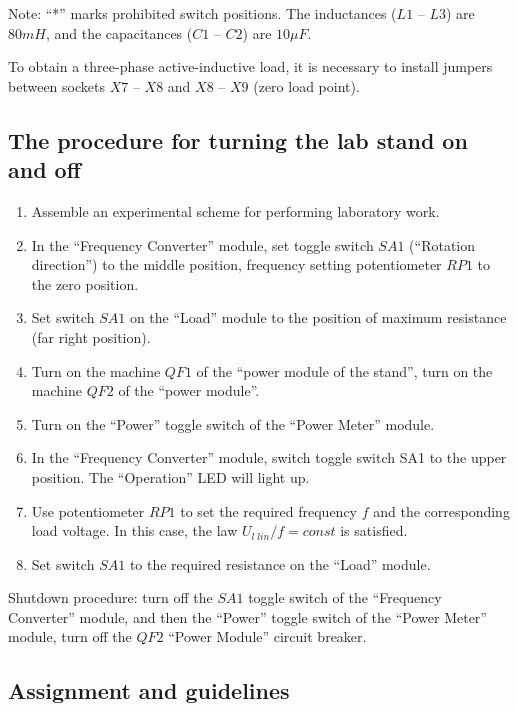 \documentclass[a4paper,14pt]{article}
\begin{document}
Note: “*” marks prohibited switch positions. The inductances ($L1$ -- $L3$) are $80 mH$, and the capacitances ($C1$ -- $C2$) are $10 \mu F$.

To obtain a three-phase active-inductive load, it is necessary to install jumpers between sockets $X7$ -- $X8$ and $X8$ -- $X9$ (zero load point).

\subsection{The procedure for turning the lab stand on and off}

\begin{enumerate}
\item Assemble an experimental scheme for performing laboratory work.
\item In the “Frequency Converter” module, set toggle switch $SA1$ (“Rotation direction”) to the middle position, frequency setting potentiometer $RP1$ to the zero position.
\item Set switch $SA1$ on the “Load” module to the position of maximum resistance (far right position).
\item Turn on the machine $QF1$ of the “power module of the stand”, turn on the machine $QF2$ of the “power module”.
\item Turn on the “Power” toggle switch of the “Power Meter” module.
\item In the “Frequency Converter” module, switch toggle switch SA1 to the upper position. The “Operation” LED will light up.
\item Use potentiometer $RP1$ to set the required frequency $f$ and the corresponding load voltage. In this case, the law $U_{l\;lin}/f = const$ is satisfied.
\item Set switch $SA1$ to the required resistance on the “Load” module.
\end{enumerate}

Shutdown procedure: turn off the $SA1$ toggle switch of the “Frequency Converter” module, and then the “Power” toggle switch of the “Power Meter” module, turn off the $QF2$ “Power Module” circuit breaker.

\subsection{Assignment and guidelines}
\end{document}
